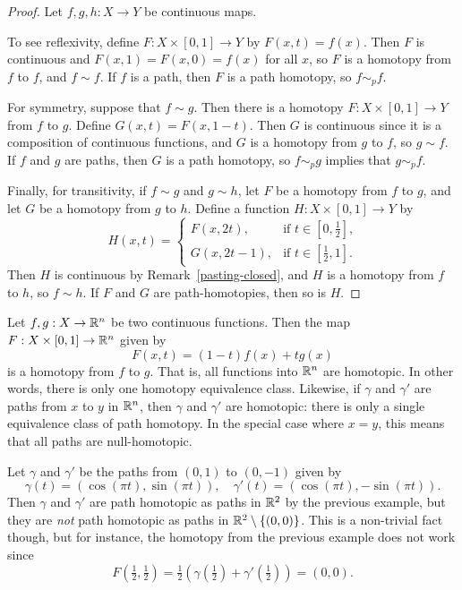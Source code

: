 \begin{proof}
  Let $f, g, h : X \to Y$ be continuous maps.
  
  To see reflexivity, define $F : X \times [0,1] \to Y$ by $F(x,t) = f(x)$. Then $F$ is continuous and $F(x,1) = F(x,0) = f(x)$ for all $x$, so $F$ is a homotopy from $f$ to $f$, and $f \sim f$. If $f$ is a path, then $F$ is a path homotopy, so $f \sim_p f$.
  
  For symmetry, suppose that $f \sim g$. Then there is a homotopy $F : X \times [0,1] \to Y$ from $f$ to $g$. Define $G(x,t) = F(x,1-t)$. Then $G$ is continuous since it is a composition of continuous functions, and $G$ is a homotopy from $g$ to $f$, so $g \sim f$. If $f$ and $g$ are paths, then $G$ is a path homotopy, so $f \sim_p g$ implies that $g \sim_p f$.
  
  Finally, for transitivity, if $f \sim g$ and $g \sim h$, let $F$ be a homotopy from $f$ to $g$, and let $G$ be a homotopy from $g$ to $h$. Define a function $H : X \times [0,1] \to Y$ by
  \[
    H(x,t) = \begin{cases} F(x,2t),& \text{if $t \in [0,\tfrac{1}{2}]$,} \\G(x,2t-1), & \text{if $t \in [\tfrac{1}{2},1]$.} \end{cases}
  \]
  Then $H$ is continuous by Remark~\ref{pasting-closed}, and $H$ is a homotopy from $f$ to $h$, so $f \sim h$. If $F$ and $G$ are path-homotopies, then so is $H$.
\end{proof}
\begin{example}
  \label{euclidean-path-homotopy}
  Let $f, g : X \to \mathbb{R}^n$ be two continuous functions. Then the map $F : X \times [0,1] \to \mathbb{R}^n$ given by
  \[
    F(x,t) = (1-t)f(x) + tg(x)
  \]
  is a homotopy from $f$ to $g$. That is, all functions into $\mathbb{R}^n$ are homotopic. In other words, there is only one homotopy equivalence class. Likewise, if $\gamma$ and $\gamma'$ are paths from $x$ to $y$ in $\mathbb{R}^n$, then $\gamma$ and $\gamma'$ are homotopic: there is only a single equivalence class of path homotopy. In the special case where $x = y$, this means that all paths are null-homotopic.
\end{example}
\begin{example}
  Let $\gamma$ and $\gamma'$ be the paths from $(0,1)$ to $(0,-1)$ given by
  \[
    \gamma(t) = (\cos (\pi t), \sin (\pi t)), \quad \gamma'(t) = (\cos(\pi t), -\sin(\pi t)).
  \]
  Then $\gamma$ and $\gamma'$ are path homotopic as paths in $\mathbb{R}^2$ by the previous example, but they are \emph{not} path homotopic as paths in $\mathbb{R}^2 \setminus \{(0,0)\}$. This is a non-trivial fact though, but for instance, the homotopy from the previous example does not work since
  \[
    F(\tfrac{1}{2},\tfrac{1}{2}) = \tfrac{1}{2}(\gamma(\tfrac{1}{2}) + \gamma'(\tfrac{1}{2})) = (0,0).
  \]
\end{example}
